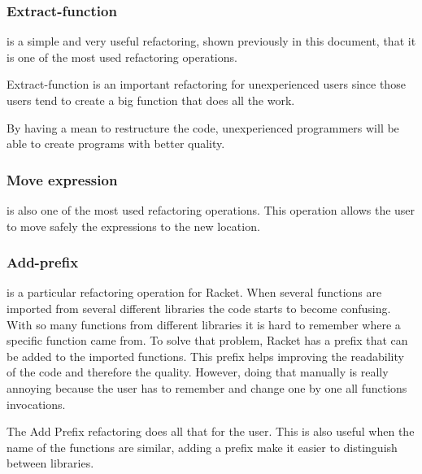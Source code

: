 \subsubsection{Extract-function}

is a simple and very useful refactoring, shown previously in this document, that it is one of the most used refactoring operations.

Extract-function is an important refactoring for unexperienced users since those users tend to create a big function that does all the work.

By having a mean to restructure the code, unexperienced programmers will be able to create programs with better quality.




\subsubsection{Move expression}

is also one of the most used refactoring operations.
This operation allows the user to move safely the expressions to the new location.



\subsubsection{Add-prefix}
is a particular refactoring operation for Racket.
When several functions are imported from several different libraries the code starts to become confusing.
With so many functions from different libraries it is hard to remember where a specific function came from.
To solve that problem, Racket has a prefix that can be added to the imported functions.
This prefix helps improving the readability of the code and therefore the quality.
However, doing that manually is really annoying because the user has to remember and change one by one all functions invocations.

The Add Prefix refactoring does all that for the user.
This is also useful when the name of the functions are similar, adding a prefix make it easier to distinguish between libraries.





